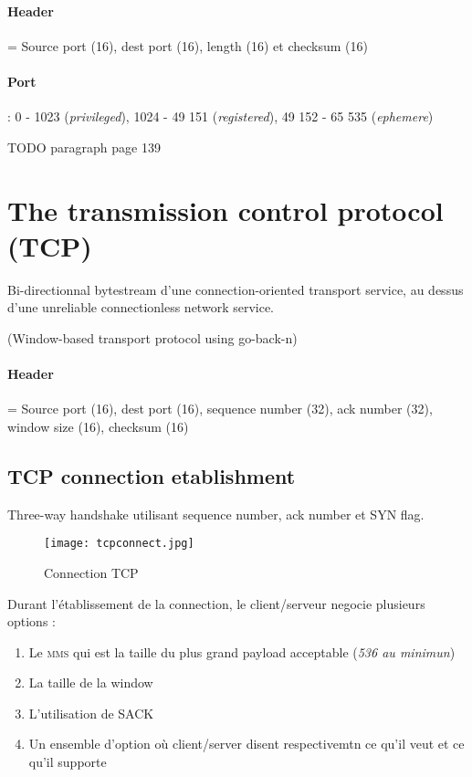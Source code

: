 \documentclass{report}
\begin{document}
\paragraph{Header} = Source port (16), dest port (16), length (16) et checksum (16)

\paragraph{Port} : 0 - 1023 (\textit{privileged}), 1024 - 49 151 (\textit{registered}),
49 152 - 65 535 (\textit{ephemere})

TODO paragraph page 139

\section{The transmission control protocol (TCP)}

Bi-directionnal bytestream d'une connection-oriented transport service, au dessus d'une unreliable connectionless network service.

(Window-based transport protocol using go-back-n)

\paragraph{Header} = Source port (16), dest port (16), sequence number (32), ack number (32), 
window size (16), checksum (16)

\subsection{TCP connection etablishment}
Three-way handshake utilisant sequence number, ack number et SYN flag.

\begin{figure}[h]
    \centering
    \texttt{[image: tcpconnect.jpg]}
\caption{Connection TCP}
\end{figure}

Durant l'établissement de la connection, le client/serveur negocie plusieurs options :
\begin{enumerate}
    \item Le \textsc{mms} qui est la taille du plus grand payload acceptable (\textit{536 au minimun})
    \item La taille de la window
    \item L'utilisation de SACK
    \item Un ensemble d'option où client/server disent respectivemtn ce qu'il veut et ce 
        qu'il supporte
\end{enumerate}
\end{document}
